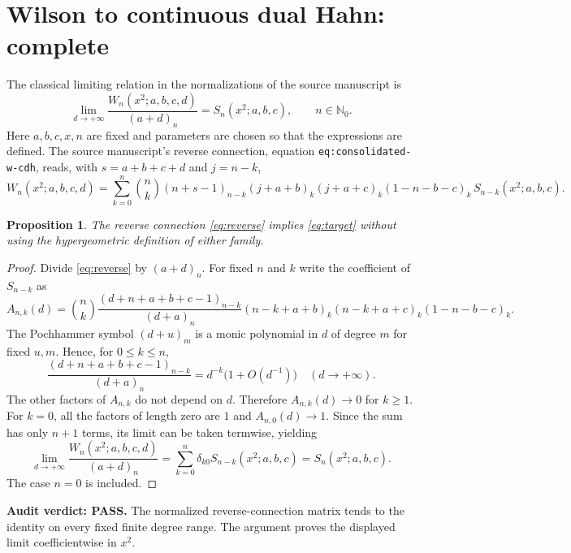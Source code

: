 \documentclass[11pt]{article}
\newtheorem{proposition}{Proposition}
\begin{document}
\section{Wilson to continuous dual Hahn: complete}
The classical limiting relation in the normalizations of the source manuscript is
\begin{equation}\label{eq:target}
\lim_{d\to+\infty}\frac{W_n(x^2;a,b,c,d)}{(a+d)_n}=S_n(x^2;a,b,c),\qquad n\in\mathbb N_0.
\end{equation}
Here $a,b,c,x,n$ are fixed and parameters are chosen so that the expressions are defined. The source manuscript's reverse connection, equation \texttt{eq:consolidated-w-cdh}, reads, with $s=a+b+c+d$ and $j=n-k$,
\begin{equation}\label{eq:reverse}
W_n(x^2;a,b,c,d)=\sum_{k=0}^n \binom nk (n+s-1)_{n-k}
(j+a+b)_k(j+a+c)_k(1-n-b-c)_k\,S_{n-k}(x^2;a,b,c).
\end{equation}
\begin{proposition}
The reverse connection \eqref{eq:reverse} implies \eqref{eq:target} without using the hypergeometric definition of either family.
\end{proposition}
\begin{proof}
Divide \eqref{eq:reverse} by $(a+d)_n$. For fixed $n$ and $k$ write the coefficient of $S_{n-k}$ as
\[
A_{n,k}(d)=\binom nk\frac{(d+n+a+b+c-1)_{n-k}}{(d+a)_n}
(n-k+a+b)_k(n-k+a+c)_k(1-n-b-c)_k.
\]
The Pochhammer symbol $(d+u)_m$ is a monic polynomial in $d$ of degree $m$ for fixed $u,m$. Hence, for $0\leq k\leq n$,
\[
\frac{(d+n+a+b+c-1)_{n-k}}{(d+a)_n}=d^{-k}\bigl(1+O(d^{-1})\bigr)
\quad(d\to+\infty).
\]
The other factors of $A_{n,k}$ do not depend on $d$. Therefore $A_{n,k}(d)\to0$ for $k\geq1$. For $k=0$, all the factors of length zero are $1$ and $A_{n,0}(d)\to1$. Since the sum has only $n+1$ terms, its limit can be taken termwise, yielding
\[
\lim_{d\to+\infty}\frac{W_n(x^2;a,b,c,d)}{(a+d)_n}
=\sum_{k=0}^n\delta_{k0}S_{n-k}(x^2;a,b,c)=S_n(x^2;a,b,c).
\]
The case $n=0$ is included.\qedhere
\end{proof}
\noindent\textbf{Audit verdict: PASS.} The normalized reverse-connection matrix tends to the identity on every fixed finite degree range. The argument proves the displayed limit coefficientwise in $x^2$.
\end{document}
